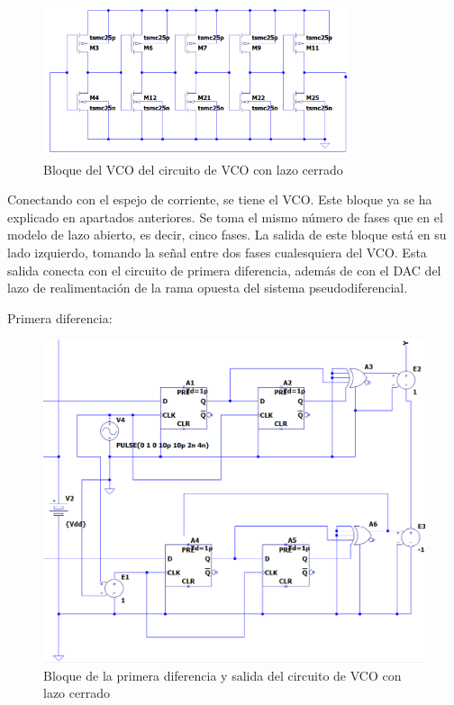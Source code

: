 \documentclass[12pt]{report} %
\begin{document}
	\begin{figure}[H]
		\includegraphics[width=0.8\textwidth]{ltspice-vco-closed-vco-block.png}
		\caption[Bloque del VCO del circuito de VCO con lazo cerrado]{Bloque del VCO del circuito de VCO con lazo cerrado}
		\label{fig:ltspice-vco-closed-vco-block.png}
	\end{figure}

	Conectando con el espejo de corriente, se tiene el VCO. Este bloque ya se ha explicado en apartados anteriores. Se toma el mismo número de fases que en el modelo de lazo abierto, es decir, cinco fases. La salida de este bloque está en su lado izquierdo, tomando la señal entre dos fases cualesquiera del VCO. Esta salida conecta con el circuito de primera diferencia, además de con el DAC del lazo de realimentación de la rama opuesta del sistema pseudodiferencial.

	Primera diferencia:
	
	\begin{figure}[H]
		\includegraphics[width=\textwidth]{ltspice-vco-closed-diff-module.PNG}
		\caption[Bloque de la primera diferencia y salida del circuito de VCO con lazo cerrado]{Bloque de la primera diferencia y salida del circuito de VCO con lazo cerrado}
		\label{fig:ltspice-vco-closed-diff-module.PNG}
	\end{figure}
\end{document}

